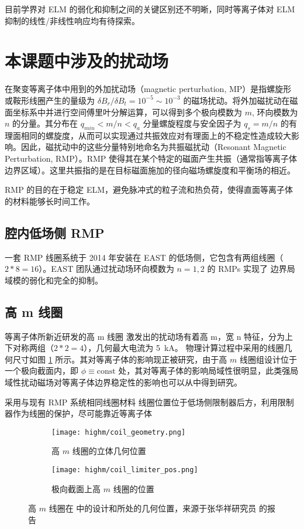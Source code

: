 目前学界对 ELM 的弱化和抑制之间的关键区别还不明晰，同时等离子体对 ELM 抑制的线性/非线性响应均有待探索。

\section{本课题中涉及的扰动场}

在聚变等离子体中用到的外加扰动场（magnetic perturbation, MP）是指螺旋形或鞍形线圈产生的量级为 $\delta B_r/\delta B_t=10^{-5}\sim 10^{-3}$ 的磁场扰动。将外加磁扰动在磁面坐标系中并进行空间傅里叶分解运算，可以得到多个极向模数为 $m$, 环向模数为 $n$ 的分量。其分布在 $q_{min}<m/n<q_a$ 分量螺旋程度与安全因子为 $q_s=m/n$ 的有理面相同的螺旋度，从而可以实现通过共振效应对有理面上的不稳定性造成较大影响。因此，磁扰动中的这些分量特别地命名为共振磁扰动（Resonant Magnetic Perturbation, RMP）。RMP 使得其在某个特定的磁面产生共振（通常指等离子体边界区域）。这里共振指的是在目标磁面施加的径向磁场螺旋度和平衡场的相近。

RMP 的目的在于稳定 ELM，避免脉冲式的粒子流和热负荷，使得直面等离子体的材料能够长时间工作。


\subsection{腔内低场侧 RMP}
一套 RMP 线圈系统于 2014 年安装在 EAST 的低场侧，它包含有两组线圈（$2*8=16$）。EAST 团队通过扰动场环向模数为 $n=1, 2$ 的 RMPs 实现了 \typeone 边界局域模的弱化和完全的抑制。

\subsection{高 m 线圈}
等离子体所新近研发的高 m 线圈  激发出的扰动场有着高 m，宽 n 特征，分为上下对称两组（$2*2=4$），几何最大电流为 \SI{5}{\kilo\ampere}。 
物理计算过程中采用的线圈几何尺寸如图 \ref{fig:highm-pos} 所示。其对等离子体的影响现正被研究，由于高 $m$ 线圈组设计位于一个极向截面内，即 $\phi\equiv \text{const}$ 处，其对等离子体的影响局域性很明显，此类强局域性扰动磁场对等离子体边界稳定性的影响也可以从中得到研究。

采用与现有 RMP 系统相同线圈材料 线圈位置位于低场侧限制器后方，利用限制器作为线圈的保护，尽可能靠近等离子体 


\begin{figure}[htbp]
    \centering%
    \begin{subfigure}{0.45\textwidth}
      \texttt{[image: highm/coil\_geometry.png]}
      \caption{高 $m$ 线圈的立体几何位置}
    \end{subfigure}
    \begin{subfigure}{0.45\textwidth}
      \texttt{[image: highm/coil\_limiter\_pos.png]}
      \caption{极向截面上高 $m$ 线圈的位置}
    \end{subfigure}
    \caption{高 $m$ 线圈在 \east 中的设计和所处的几何位置，来源于张华祥研究员 \cite{zhang_highm} 的报告}
    \label{fig:highm-pos}
  \end{figure}

